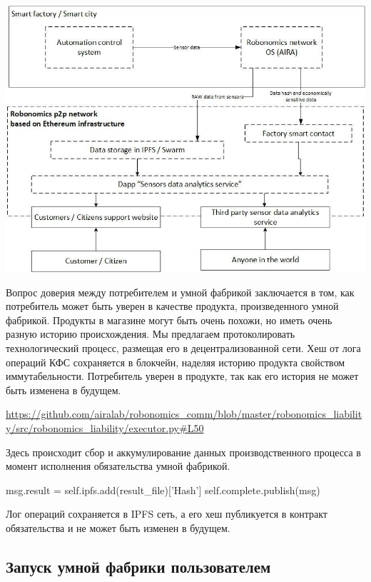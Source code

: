 \documentclass{article}
\begin{document}
\includegraphics[width=1\textwidth]{app-1.png} 

Вопрос доверия между потребителем и умной фабрикой заключается в том, как потребитель может быть уверен в качестве продукта, произведенного умной фабрикой. Продукты в магазине могут быть очень похожи, но иметь очень разную историю происхождения. Мы предлагаем протоколировать технологический процесс, размещая его в децентрализованной сети. Хеш от лога операций КФС сохраняется в блокчейн, наделяя историю продукта свойством иммутабельности. Потребитель уверен в продукте, так как его история не может быть изменена в будущем. 

\url{https://github.com/airalab/robonomics_comm/blob/master/robonomics_liability/src/robonomics_liability/executor.py#L50}

Здесь происходит сбор и аккумулирование данных производственного процесса в момент исполнения обязательства умной фабрикой.


\begin{python}
 {
	msg.result = self.ipfs.add(result_file)['Hash']
	self.complete.publish(msg)
  }
\end{python}


Лог операций сохраняется в IPFS сеть, а его хеш публикуется в контракт обязательства и не может быть изменен в будущем.

\subsection{Запуск умной фабрики пользователем}
\end{document}
